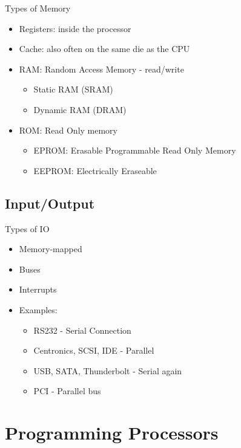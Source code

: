 \documentclass{beamer}
\begin{document}
\begin{frame}{Types of Memory}
  \begin{itemize}
  \item
    Registers: inside the processor
  \item
    Cache: also often on the same die as the CPU
  \item
    RAM: Random Access Memory - read/write
    \begin{itemize}
    \item
      Static RAM (SRAM)
    \item
      Dynamic RAM (DRAM)
    \end{itemize}
  \item
    ROM: Read Only memory
    \begin{itemize}
    \item
      EPROM: Erasable Programmable Read Only Memory
    \item
      EEPROM: Electrically Eraseable
    \end{itemize}
  \end{itemize}
\end{frame}

\subsection[IO]{Input/Output}

\begin{frame}{Types of IO}
  \begin{itemize}
  \item
    Memory-mapped
  \item
    Buses
  \item
    Interrupts
  \item
    Examples:
    \begin{itemize}
    \item
      RS232 - Serial Connection
    \item
      Centronics, SCSI, IDE - Parallel
    \item
      USB, SATA, Thunderbolt - Serial again
    \item
      PCI - Parallel bus
    \end{itemize}
  \end{itemize}
\end{frame}

\section{Programming Processors}
\end{document}
